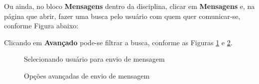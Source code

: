 Ou ainda, no bloco \textbf{Mensagens} dentro da disciplina, clicar em \textbf{Mensagens} e, na página que abrir, fazer uma busca pelo usuário com quem quer comunicar-se, conforme Figura abaixo:


 \begin{center}
 \end{center}


Clicando em \textbf{Avançado} pode-se filtrar a busca, conforme as Figuras \ref{fig:cap2_20} e \ref{fig:cap2_21}.

\begin{figure}[htbp]
 \begin{center}
  \caption{Selecionando usuário para envio de mensagem}
  \label{fig:cap2_20}
 \end{center}
\end{figure}

\begin{figure}[htbp]
 \begin{center}
  \caption{Opções avançadas de envio de mensagem}
  \label{fig:cap2_21}
 \end{center}
\end{figure}

